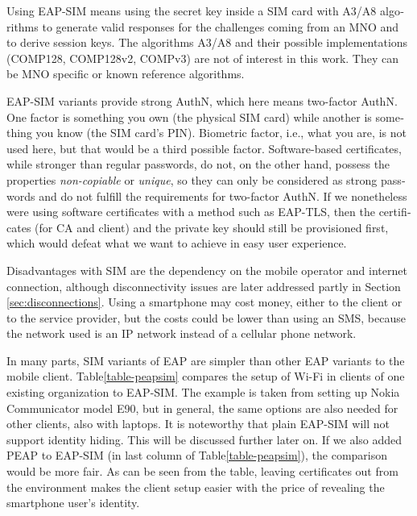 \documentclass[12pt,a4paper,english]{tutthesis}
\begin{document}
\begin{otherlanguage}{english}
  Using EAP-SIM means using the secret key inside a SIM card with A3/A8
algorithms to generate valid responses for the challenges coming from 
an MNO and to derive session keys.  The algorithms A3/A8 and their
possible implementations (COMP128, COMP128v2, COMPv3) are not of
interest in this work. They can be MNO specific or known reference algorithms.


EAP-SIM variants provide strong AuthN, which here means  two-factor
AuthN.  One factor  is something you own (the physical SIM card) while another
is  something you know (the SIM card's PIN). Biometric factor, i.e., what you are,
is not used here, but that would be a third  possible factor.
Software-based certificates, while stronger than regular passwords, do
not, on the other hand, possess the properties \emph{non-copiable} or
\emph{unique}, so they can only be considered as strong passwords and do
not fulfill the requirements for two-factor AuthN.  If we
nonetheless were using software certificates with a method such as
EAP-TLS, then the certificates (for CA and client) and the private key
should still be provisioned first, which would defeat what we want to
achieve in easy user experience.


Disadvantages with SIM are the dependency on the mobile operator and internet
connection, although disconnectivity issues are later addressed
partly in Section \ref{sec:disconnections}.
Using a smartphone may cost money, either to the client or to the service
provider, but the costs could be lower than using an SMS, because 
the network  used is an IP network instead of a cellular phone network.

In many parts, SIM variants of EAP are simpler than other EAP
variants to the mobile client.  Table\ref{table-peapsim} compares the setup of Wi-Fi
in clients of one existing organization to EAP-SIM. The example 
is taken from setting up Nokia Communicator model E90, but in general,
the same options are also needed for other clients, also with laptops. It
is noteworthy that plain EAP-SIM will not support identity
hiding. This will be  discussed further later on. If we also added PEAP
 to EAP-SIM (in last column of Table\ref{table-peapsim}), the comparison would be more fair.
As can be seen from the table, leaving certificates out from the environment
makes the client setup easier with the price of revealing the smartphone user's
identity.  




\end{otherlanguage}
\end{document}
